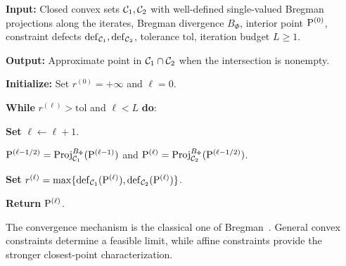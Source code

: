 \begin{algH}\label{alg:cyclic-bregman-projections}
\textbf{Input:} Closed convex sets $\Cc_1,\Cc_2$ with well-defined single-valued Bregman projections along the iterates, Bregman divergence $B_\Phi$, interior point $\P^{(0)}$, constraint defects $\mathrm{def}_{\Cc_1},\mathrm{def}_{\Cc_2}$, tolerance $\mathrm{tol}$, iteration budget $L\geq1$.

\textbf{Output:} Approximate point in $\Cc_1\cap\Cc_2$ when the intersection is nonempty.

\textbf{Initialize:} Set $r^{(0)}=+\infty$ and $\ell=0$.

\textbf{While} $r^{(\ell)}>\mathrm{tol}$ and $\ell<L$ \textbf{do}:
\begin{algblock}

\textbf{Set} $\ell\leftarrow \ell+1$.

$\P^{(\ell-1/2)}=\Proj_{\Cc_1}^{B_\Phi}(\P^{(\ell-1)})$ and
$\P^{(\ell)}=\Proj_{\Cc_2}^{B_\Phi}(\P^{(\ell-1/2)})$.

\textbf{Set} $r^{(\ell)}=\max\{\mathrm{def}_{\Cc_1}(\P^{(\ell)}),\mathrm{def}_{\Cc_2}(\P^{(\ell)})\}$.
\end{algblock}
\algreturnskip
\textbf{Return} $\P^{(\ell)}$.
\end{algH}

The convergence mechanism is the classical one of Bregman~\cite{bregman1967relaxation}. General convex constraints determine a feasible limit, while affine constraints provide the stronger closest-point characterization.

